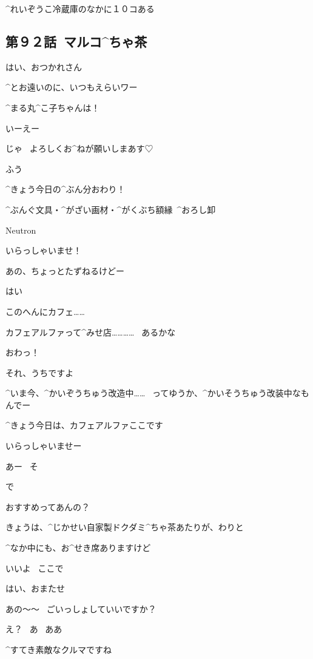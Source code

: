 \Alpha ^{れいぞうこ}{冷蔵庫}のなかに１０コある


\subsection{第９２話\ マルコ^{ちゃ}{茶}}

\page[56]
\Person はい、おつかれさん

\Person ^{とお}{遠}いのに、いつもえらいワー

\Person ^{まる}{丸}^{こ}{子}ちゃんは！

\Maruko いーえー

\Maruko じゃ
\ よろしくお^{ねが}{願}いしまあす♡

\Maruko ふう

\Maruko ^{きょう}{今日}の^{ぶん}{分}おわり！

\Sign ^{ぶんぐ}{文具}・^{がざい}{画材}・^{がくぶち}{額縁}\ ^{おろし}{卸}

\Sign Neutron

\page[59]
\Alpha いらっしゃいませ！

\page[60]
\Maruko あの、ちょっとたずねるけどー

\Alpha はい

\Maruko このへんにカフェ……

\Maruko カフェアルファって^{みせ}{店}…………
\ あるかな

\Alpha おわっ！

\page[61]
\Alpha それ、うちですよ

\Alpha ^{いま}{今}、^{かいぞうちゅう}{改造中}……
\ ってゆうか、^{かいそうちゅう}{改装中}なもんでー

\Alpha ^{きょう}{今日}は、カフェアルファここです

\Alpha いらっしゃいませー

\Maruko あー
\ そ

\page[62]
\Maruko で

\Maruko おすすめってあんの？

\Alpha きょうは、^{じかせい}{自家製}ドクダミ^{ちゃ}{茶}あたりが、わりと

\Alpha ^{なか}{中}にも、お^{せき}{席}ありますけど

\Maruko いいよ
\ ここで

\Alpha はい、おまたせ

\Alpha あの〜〜
\ ごいっしょしていいですか？

\Maruko え？
\ あ
\ ああ

\page[63]
\Alpha ^{すてき}{素敵}なクルマですね

